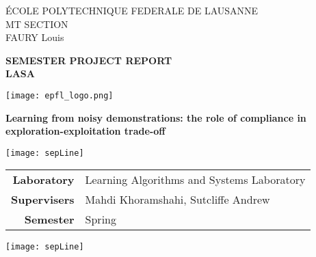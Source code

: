 





\begin{titlepage}
        	{\sffamily
	\large
        		\noindent \'ECOLE POLYTECHNIQUE FEDERALE DE LAUSANNE \\
        		MT SECTION\\
        		FAURY Louis \\
        	}
	
	\vfill 
        \begin{center}
   		{\sffamily\Huge
         		\textbf{SEMESTER PROJECT REPORT} \\
			\vspace{0.3cm}
			\Large
			\textbf{LASA}
		}
		\vspace{2cm}
	
        		\texttt{[image: epfl\_logo.png]}
        
        		\vspace{1.5cm}
         
         	\sffamily\huge\textbf{ 	
Learning from noisy demonstrations: the role of compliance in exploration-exploitation trade-off} \\
        \end{center}
        
	\vspace{2cm}
         \centering\texttt{[image: sepLine]}
         \vspace{0.2cm}

	\large
        \begin{center}
		\begin{tabular}{rl}
    			\textbf{Laboratory} & Learning Algorithms and Systems Laboratory\\
    			\textbf{Supervisers} & Mahdi Khoramshahi, Sutcliffe Andrew\\
			\textbf{Semester} & Spring\\
		\end{tabular}
	\end{center}
	\vspace{0.05cm}
         \centering\texttt{[image: sepLine]}
         \vspace{0.6cm}
         \vfill
\end{titlepage}
